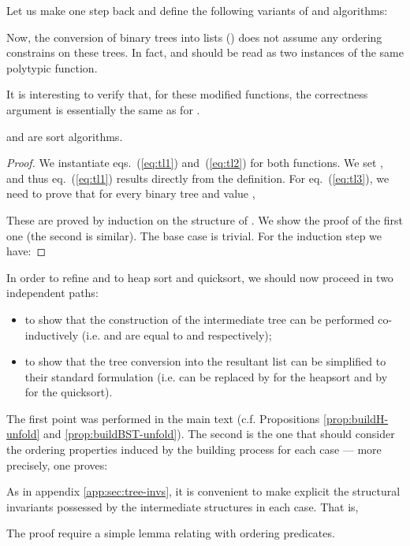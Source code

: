 \documentclass[a4paper,11pt]{llncs}
\begin{document}
Let us make one step back and define the following variants of
 and  algorithms: \def\BT2list{\f{BT2list}}

Now, the conversion of binary trees into lists () does not assume any
ordering constrains on these trees. In fact,  and 
should be read as two instances of the same polytypic function.

It is interesting to verify that, for these modified functions, the
correctness argument is essentially the same as for .

\begin{proposition}
   and  are sort algorithms.
\end{proposition}
\begin{proof}
  We instantiate eqs.~(\ref{eq:tl1}) and~(\ref{eq:tl2}) for both
  functions. We set , and thus eq.~(\ref{eq:tl1})
  results directly from the definition. For eq.~(\ref{eq:tl3}), we
  need to prove that for every binary tree  and value ,

These are proved by induction on the structure of . We show the
proof of the first one (the second is similar). The base case is
trivial. For the induction step we have:

\end{proof}

\medskip

In order to refine  and  to heap sort and
quicksort, we should now proceed in two independent paths:
\begin{itemize}
\item to show that the construction of the intermediate tree can
  be performed co-inductively (i.e.  and  are
  equal to  and  respectively);
\item to show that the tree conversion into the resultant list can be
  simplified to their standard formulation (i.e.  can be
  replaced by  for the heapsort and by  for the
  quicksort).
\end{itemize}

The first point was performed in the main text (c.f. Propositions
\ref{prop:buildH-unfold} and \ref{prop:buildBST-unfold}). The second
is the one that should consider the ordering properties induced by the
building process for each case --- more precisely, one proves:

As in appendix \ref{app:sec:tree-invs}, it is convenient to make
explicit the structural invariants possessed by the intermediate
structures in each case. That is,


The proof require a simple lemma relating  with ordering predicates.
\end{document}
